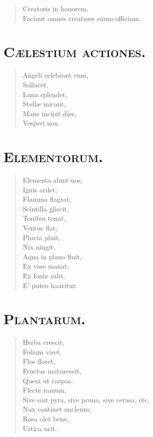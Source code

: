 \documentclass[12pt,  postvopaper]{memoir}
\begin{document}
\begin{verse}

  Creatoris in honorem,\\
  Faciunt omnes creaturæ suum officium.\\
\end{verse}
\section*{\textsc{Cælestium actiones.}}

\begin{verse}

  Angeli celebrant eum,\\
  Sollucet,\\
  Luna splendet,\\
  Stellæ micant,\\
  Mane incipit dies,\\
  Vesperi nox.\\
\end{verse}


\section*{\textsc{Elementorum.}}

\begin{verse}

  Elementa alunt nos,\\
  Ignis ardet,\\
  Flamma flagrat,\\
  Scintilla gliscit,\\
  Tonitru tonat,\\
  Ventus flat,\\
  Pluvia pluit,\\
  Nix ningit,\\
  Aqua in plano fluit,\\
  Ex vase manat,\\
  Ex fonte salit,\\
  E' puteo hauritur.\\
\end{verse}
\section*{\textsc{Plantarum.}}

\begin{verse}

  Herba crescit,\\
  Folium viret,\\
  Flos floret,\\
  Fructus maturescit,\\
  Quem ut carpas,\\
  Flecte ramum,\\
  Sive sint pyra, sive pruna, sive cerasa, etc.\\
  Nux continet nucleum,\\
  Rosa olet bene,\\
  Urtica urit.\\
\end{verse}
\end{document}
